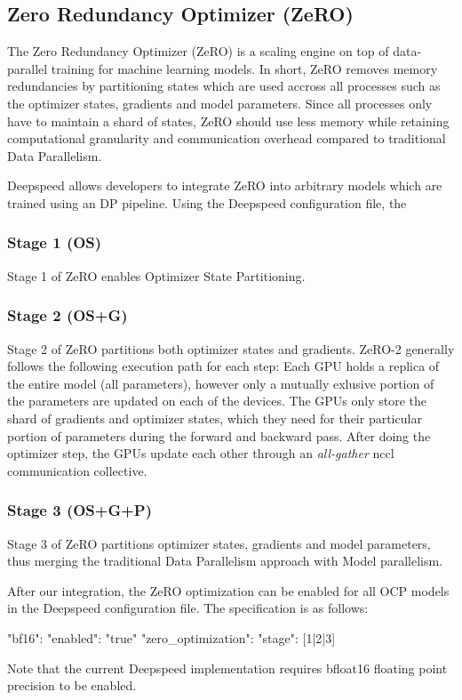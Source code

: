 \subsection{Zero Redundancy Optimizer (ZeRO)}

The Zero Redundancy Optimizer (ZeRO) is a scaling engine on top of data-parallel training for 
machine learning models. In short, ZeRO removes memory redundancies by partitioning states which 
are used accross all processes such as the optimizer states, gradients and model parameters. 
Since all processes only have to maintain a shard of states, ZeRO should use less memory while 
retaining computational granularity and communication overhead compared to traditional Data 
Parallelism.

Deepspeed allows developers to integrate ZeRO into arbitrary models which are trained using an 
DP pipeline. Using the Deepspeed configuration file, the 

\subsubsection{Stage 1 (OS)}

Stage 1 of ZeRO enables Optimizer State Partitioning. 

\subsubsection{Stage 2 (OS+G)}

Stage 2 of ZeRO partitions both optimizer states and gradients. ZeRO-2 generally follows the following 
execution path for each step: Each GPU holds a replica of the entire model (all parameters), however 
only a mutually exlusive portion of the parameters are updated on each of the devices. The GPUs only store 
the shard of gradients and optimizer states, which they need for their particular portion of parameters 
during the forward and backward pass. After doing the optimizer step, the GPUs update each other through 
an \textit{all-gather} nccl communication collective. 

\subsubsection{Stage 3 (OS+G+P)}

Stage 3 of ZeRO partitions optimizer states, gradients and model parameters, thus merging the 
traditional Data Parallelism approach with Model parallelism.



After our integration, the ZeRO optimization can be enabled for all OCP models in the Deepspeed configuration 
file. The specification is as follows:

\begin{json}
{
    "bf16": {
        "enabled": "true"
    }
    "zero_optimization": {
        "stage": [1|2|3]
    }
}
\end{json}

Note that the current Deepspeed implementation requires bfloat16 floating point precision to be enabled. 
